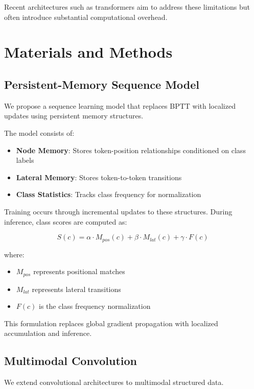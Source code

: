 \documentclass[lineno]{wlpeerj}
\begin{document}
	Recent architectures such as transformers aim to address these limitations but often introduce substantial computational overhead.
	
	\section{Materials and Methods}
	
	\subsection{Persistent-Memory Sequence Model}
	
	We propose a sequence learning model that replaces BPTT with localized updates using persistent memory structures.
	
	The model consists of:
	
	\begin{itemize}
		\item \textbf{Node Memory}: Stores token-position relationships conditioned on class labels
		\item \textbf{Lateral Memory}: Stores token-to-token transitions
		\item \textbf{Class Statistics}: Tracks class frequency for normalization
	\end{itemize}
	
	Training occurs through incremental updates to these structures. During inference, class scores are computed as:
	
	\begin{equation}
		S(c) = \alpha \cdot M_{pos}(c) + \beta \cdot M_{lat}(c) + \gamma \cdot F(c)
	\end{equation}
	
	where:
	\begin{itemize}
		\item $M_{pos}$ represents positional matches
		\item $M_{lat}$ represents lateral transitions
		\item $F(c)$ is the class frequency normalization
	\end{itemize}
	
	This formulation replaces global gradient propagation with localized accumulation and inference.
	
	\subsection{Multimodal Convolution}
	
	We extend convolutional architectures to multimodal structured data.
	
\end{document}
